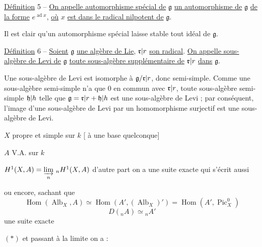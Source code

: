 \uline{Définition} 5 -- \uline{On appelle automorphisme spécial de} $\mathfrak g$ \uline{un automorphisme de} $\mathfrak g$ \uline{de la forme} $e^{\operatorname{ad}x}$, \uline{où} $x$ \uline{est dans le radical nilpotent de} $\mathfrak g$.

Il est clair qu'un automorphisme spécial laisse stable tout idéal de $\mathfrak g$.

\uline{Définition} 6 -- \uline{Soient} $\mathfrak g$ \uline{une algèbre de Lie}, $\mathfrak r|r$ \uline{son radical}. \uline{On appelle sous-algèbre de Levi de} $\mathfrak g$ \uline{toute sous-algèbre supplémentaire de} $\mathfrak r|r$ \uline{dans} $\mathfrak g$.

Une sous-algèbre de Levi est isomorphe à $\mathfrak g/\mathfrak r|r$, donc semi-simple. Comme une sous-algèbre semi-simple n'a que $0$ en commun avec $\mathfrak r|r$, toute sous-algèbre semi-simple $\mathfrak h|h$ telle que $\mathfrak g=\mathfrak r|r+\mathfrak h|h$ est une sous-algèbre de Levi ; par conséquent, l'image d'une sous-algèbre de Levi par un homomorphisme surjectif est une sous-algèbre de Levi.


$X$ propre et simple sur $k$ [ à une base quelconque]

$A$ V.A. sur $k$

$H^1(X,A)=\underset{n}{\varinjlim}\ {}_nH^1(X,A)$ \deleted{$\unsure{=}$} d'autre part on a une suite exacte
qui s'écrit aussi

ou encore, sachant que
\[
\operatorname{Hom}(\operatorname{Alb}_X,A)\simeq\operatorname{Hom}(A',(\operatorname{Alb}_X)')=\operatorname{Hom}(A',\operatorname{Pic}_X^0)
\]
\[
D({}_nA)\simeq{}_nA'
\]
une suite exacte

$(*)$
et passant à la limite  on a :

